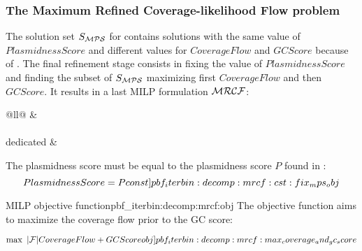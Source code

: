 \subsubsection{The Maximum Refined Coverage-likelihood Flow problem \MRCF{}}\label{sec:pbf_iterbin:decomp:mrcf}

The solution set \(S_{\mathcal{MPS}}{}\) for \MPS{} contains solutions with the same value of \(PlasmidnessScore\) and different values for \(CoverageFlow\) and \(GCScore\) because of .
The final refinement stage consists in fixing the value of \(PlasmidnessScore\) and finding the subset of \(S_{\mathcal{MPS}}{}\) maximizing first \(CoverageFlow\) and then \(GCScore\).
It results in a last MILP formulation \(\mathcal{MRCF}{}\):

\begin{table}[h!]
  \centering
  \label{tab:decomp:mrcf:cst}
  \begin{tabular}{@{}ll@{}}
    \toprule
     &  \\
    \midrule
     \\
    \addlinespace
    \MRCF{} dedicated &  \\
    \bottomrule
  \end{tabular}
\end{table}

The plasmidness score must be equal to the plasmidness score \(P\) found in \MPS{}:
\begin{equation}
  PlasmidnessScore = P
  \cstlabel{pbf_iterbin:decomp:mrcf:cst:fix_mps_obj} %
\end{equation}

\begin{definition}{\MRCF{} MILP objective function}{pbf_iterbin:decomp:mrcf:obj}
  The objective function aims to maximize the coverage flow prior to the GC score:
  \begin{Constraint}
    \begin{equation}
      \max ~ |\Fragments{}| CoverageFlow + GCScore
      \objlabel{pbf_iterbin:decomp:mrcf:max_coverage_and_gc_score} %
    \end{equation}
  \end{Constraint}
\end{definition}
